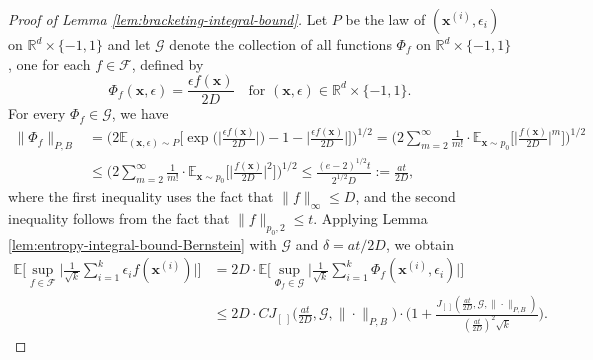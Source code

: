 \documentclass[10pt]{article}
\newcommand{\E}{{\mathbb E}}
\newcommand{\F}{{\mathcal{F}}}
\newcommand{\G}{{\mathcal{G}}}
\newcommand{\R}{{\mathbb R}}
\newcommand{\xbf}{{\mathbf{x}}}
\begin{document}
\begin{proof}[Proof of Lemma \ref{lem:bracketing-integral-bound}]
Let $P$ be the law of $(\xbf^{(i)}, \epsilon_i)$ on 
$\R^d \times \{-1, 1\}$ and let $\G$ denote the collection of all functions 
$\Phi_f$ on $\R^d \times \{-1, 1\}$, one for each $f \in \F$, defined by 
\begin{equation*}
    \Phi_f(\xbf, \epsilon) = \frac{\epsilon f(\xbf)}{2D}
    \quad \text{for } (\xbf, \epsilon) \in \R^d \times \{-1, 1\}.
\end{equation*}
For every $\Phi_f \in \G$, we have
\begin{equation*}
\begin{aligned}
    \|\Phi_f\|_{P, B} 
    &= \bigg(2\E_{(\xbf, \epsilon) \sim P} 
    \Big[\exp\Big(\Big|\frac{\epsilon f(\xbf)}{2D}\Big|\Big)
    - 1 - \Big|\frac{\epsilon f(\xbf)}{2D}\Big|\Big]\bigg)^{1/2}
    = \bigg(2 \sum_{m = 2}^{\infty} \frac{1}{m!} \cdot 
    \E_{\xbf \sim p_0} 
    \Big[\Big|\frac{f(\xbf)}{2D}\Big|^m \Big]\bigg)^{1/2} \\
    &\le \bigg(2 \sum_{m = 2}^{\infty} \frac{1}{m!} \cdot 
    \E_{\xbf \sim p_0} 
    \Big[\Big|\frac{f(\xbf)}{2D}\Big|^2 \Big]\bigg)^{1/2} 
    \le \frac{(e - 2)^{1/2} t}{2^{1/2}D} 
    := \frac{a t}{2D},
\end{aligned}
\end{equation*}
where the first inequality uses the fact that $\|f\|_{\infty} \le D$, 
and the second inequality follows from the fact that $\|f\|_{p_0, 2} \le t$.
Applying Lemma \ref{lem:entropy-integral-bound-Bernstein} with $\G$ and 
$\delta = a t/2D$, we obtain
\begin{equation}\label{eq:bracketing-integral-bound-Bernstein-G}
\begin{aligned}
    \E\Big[\sup_{f \in \F} \Big|\frac{1}{\sqrt{k}} 
    \sum_{i = 1}^{k} \epsilon_i f(\xbf^{(i)})\Big|\Big] 
    &= 2D \cdot \E\Big[\sup_{\Phi_f \in \G} \Big|\frac{1}{\sqrt{k}} 
    \sum_{i = 1}^{k} \Phi_f(\xbf^{(i)}, \epsilon_i)\Big|\Big] \\
    &\le 2D \cdot C J_{[ \ ]}\Big(\frac{a t}{2D}, \G, \| \cdot \|_{P, B}\Big) 
    \cdot \Big(1 +  
    \frac{J_{[ \ ]}(\frac{a t}{2D}, \G, 
    \| \cdot \|_{P, B})}{(\frac{a t}{2D})^2 \sqrt{k}}\Big).
\end{aligned}
\end{equation}


\end{proof}
\end{document}
